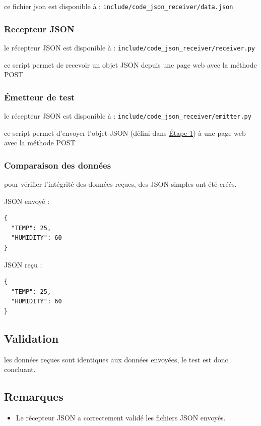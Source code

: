 ce fichier json est disponible à : \texttt{include/code\_json\_receiver/data.json}

\subsubsection{Recepteur JSON}
\label{sec:json_receiver_code}

le récepteur JSON est disponible à : \texttt{include/code\_json\_receiver/receiver.py}

ce script permet de recevoir un objet JSON depuis une page web avec la méthode POST

\subsubsection{Émetteur de test}
\label{sec:json_sender_code}

le récepteur JSON est disponible à : \texttt{include/code\_json\_receiver/emitter.py}

ce script permet d'envoyer l'objet JSON (défini dans \hyperref[sec:json_example]{Étape 1}) à une page web avec la méthode POST

\subsubsection{Comparaison des données}
\label{sec:json_compare}

pour vérifier l'intégrité des données reçues, des JSON simples ont été créés.

JSON envoyé :
\begin{verbatim}
{
  "TEMP": 25,
  "HUMIDITY": 60
}
\end{verbatim}

JSON reçu :
\begin{verbatim}
{
  "TEMP": 25,
  "HUMIDITY": 60
}
\end{verbatim}

\subsection{Validation}

les données reçues sont identiques aux données envoyées, le test est donc concluant.

\subsection{Remarques}
\begin{itemize}
  \item Le récepteur JSON a correctement validé les fichiers JSON envoyés.
\end{itemize}




